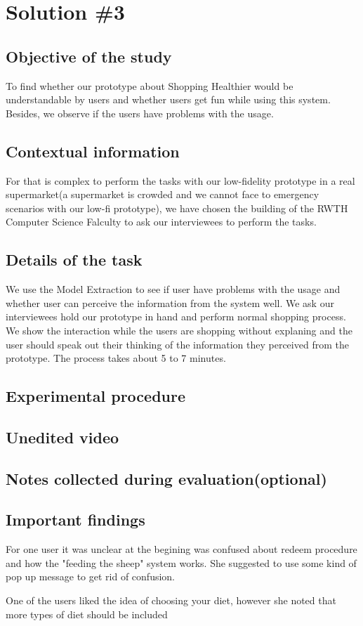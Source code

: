 \section{Solution \#3}

\subsection{Objective of the study}
To find whether our prototype about Shopping Healthier would be understandable by users and whether users get fun while using this system. Besides, we observe if the users have problems with the usage.

\subsection{Contextual information}
For that is complex to perform the tasks with our low-fidelity prototype in a real supermarket(a supermarket is crowded and we cannot face to emergency scenarios with our low-fi prototype), we have chosen the building of the RWTH Computer Science Falculty to ask our interviewees to perform the tasks.

\subsection{Details of the task}
We use the Model Extraction to see if user have problems with the usage and whether user can  perceive the information from the system well. We ask our interviewees hold our prototype in hand and perform normal shopping process. We show the interaction while the users are shopping without explaning and the user should speak out their thinking of the information they perceived from the prototype. The process takes about 5 to 7 minutes.

\subsection{Experimental procedure}


\subsection{Unedited video}

\subsection{Notes collected during evaluation(optional)}

\subsection{Important findings}
 \item For one user it was unclear at the begining was confused about redeem procedure and how the "feeding the sheep" system
works. She suggested to use some kind of pop up message to get rid of confusion.
 \item One of the users liked the idea of choosing your diet, however she noted that more types of diet should be included
